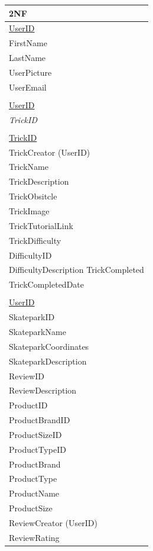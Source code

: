 \begin{center}
\begin{tabular}{|p{4cm}|}  \hline
\textbf{2NF} \\ \hline
\underline{UserID} \\ 
FirstName \\
LastName \\
UserPicture \\
UserEmail \\
\hline \\
\hline

\underline{UserID} \\
\emph{TrickID} \\
\hline \\
\hline


\underline{TrickID} \\ 
TrickCreator (UserID) \\
TrickName \\
TrickDescription \\
TrickObsitcle \\
TrickImage \\
TrickTutorialLink \\
TrickDifficulty \\
DifficultyID \\
DifficultyDescription
TrickCompleted \\
TrickCompletedDate \\
\hline \\
\hline

\underline{UserID} \\
SkateparkID \\
SkateparkName \\
SkateparkCoordinates \\
SkateparkDescription \\
ReviewID \\ 
ReviewDescription \\
ProductID \\
ProductBrandID \\
ProductSizeID \\
ProductTypeID \\
ProductBrand \\
ProductType \\
ProductName \\
ProductSize \\
ReviewCreator (UserID)  \\
ReviewRating \\ \hline 





\end{tabular}
\label{tab:2NF User Database}
\end{center}


